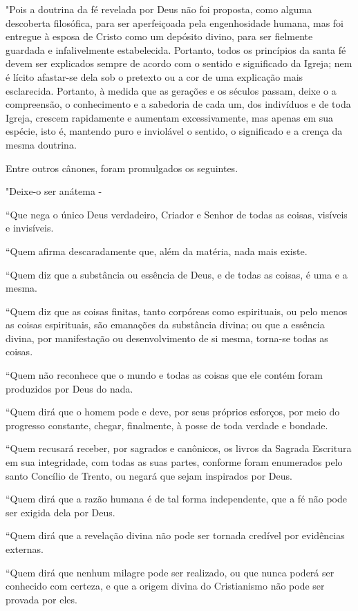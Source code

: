 \documentclass[11pt,a5paper,twoside,openany]{book}
\begin{document}
"Pois a doutrina da fé revelada por Deus não foi proposta, como alguma descoberta filosófica, para ser aperfeiçoada pela engenhosidade humana, mas foi entregue à esposa de Cristo como um depósito divino, para ser fielmente guardada e infalivelmente estabelecida. Portanto, todos os princípios da santa fé devem ser explicados sempre de acordo com o sentido e significado da Igreja; nem é lícito afastar-se dela sob o pretexto ou a cor de uma explicação mais esclarecida. Portanto, à medida que as gerações e os séculos passam, deixe o a compreensão, o conhecimento e a sabedoria de cada um, dos indivíduos e de toda Igreja, crescem rapidamente e aumentam excessivamente, mas apenas em sua espécie, isto é, mantendo puro e inviolável o sentido, o significado e a crença da mesma doutrina.

Entre outros cânones, foram promulgados os seguintes.

"Deixe-o ser anátema -

“Que nega o único Deus verdadeiro, Criador e Senhor de todas as coisas, visíveis e invisíveis.

“Quem afirma descaradamente que, além da matéria, nada mais existe.

“Quem diz que a substância ou essência de Deus, e de todas as coisas, é uma e a mesma.

“Quem diz que as coisas finitas, tanto corpóreas como espirituais, ou pelo menos as coisas espirituais, são emanações da substância divina; ou que a essência divina, por manifestação ou desenvolvimento de si mesma, torna-se todas as coisas.

“Quem não reconhece que o mundo e todas as coisas que ele contém foram produzidos por Deus do nada.

“Quem dirá que o homem pode e deve, por seus próprios esforços, por meio do progresso constante, chegar, finalmente, à posse de toda verdade e bondade.

“Quem recusará receber, por sagrados e canônicos, os livros da Sagrada Escritura em sua integridade, com todas as suas partes, conforme foram enumerados pelo santo Concílio de Trento, ou negará que sejam inspirados por Deus.

“Quem dirá que a razão humana é de tal forma independente, que a fé não pode ser exigida dela por Deus.

“Quem dirá que a revelação divina não pode ser tornada credível por evidências externas.

“Quem dirá que nenhum milagre pode ser realizado, ou que nunca poderá ser conhecido com certeza, e que a origem divina do Cristianismo não pode ser provada por eles.
\end{document}
